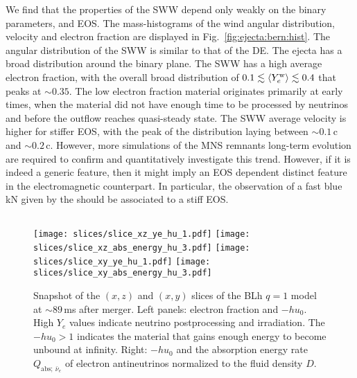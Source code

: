 We find that the properties of the \ac{SWW} depend only weakly on the binary parameters,
\mr{} and \ac{EOS}. The mass-histograms of the wind angular distribution, velocity and 
electron fraction are displayed in Fig.~\ref{fig:ejecta:bern:hist}. 
The angular distribution of the \ac{SWW} is similar to that of the \ac{DE}. The ejecta 
has a broad distribution around the binary plane.
The \ac{SWW} has a high average electron fraction, with the overall 
broad distribution of $0.1\lesssim \langle Y^{\text{w}}_{e}\rangle\lesssim0.4$ that peaks at ${\sim}0.35$.
The low electron fraction material originates primarily at early times, when the 
material did not have enough time to be processed by neutrinos and before the 
outflow reaches quasi-steady state.
The \ac{SWW} average velocity is higher for stiffer \ac{EOS}, with the peak 
of the distribution laying between ${\sim}0.1\,$c and ${\sim}0.2\,$c.
However, more simulations of the \ac{MNS} remnants long-term evolution are 
required to confirm and quantitatively investigate this trend.
However, if it is indeed a generic feature, then it might imply 
an \ac{EOS} dependent distinct feature in the electromagnetic counterpart. 
In particular, the observation of a fast blue kN given by the \swind{}
should be associated to a stiff \ac{EOS}.



\subsection{\nwind{}} \label{sec:bns_sims:nwind}

\begin{figure*}[t]
    \centering 
    \texttt{[image: slices/slice\_xz\_ye\_hu\_1.pdf]}
    \texttt{[image: slices/slice\_xz\_abs\_energy\_hu\_3.pdf]}
    \texttt{[image: slices/slice\_xy\_ye\_hu\_1.pdf]}
    \texttt{[image: slices/slice\_xy\_abs\_energy\_hu\_3.pdf]}
    \caption{Snapshot of the $(x,z)$ and $(x,y)$ slices of the BLh $q=1$ model at 
        ${\sim}89\,$ms after merger. Left panels: electron fraction and
        $-hu_0$. High $Y_e$ values indicate neutrino
        postprocessing and irradiation. The $-hu_0>1$ indicates the
        material that gains enough energy to become unbound at
        infinity. 
        Right: $-hu_0$ and the absorption energy rate $Q_{\text{abs};\:\bar{\nu}_e}$ 
        of electron antineutrinos normalized to the fluid density $D$.
    }
    \label{fig:slice:heating_hu}
\end{figure*}

